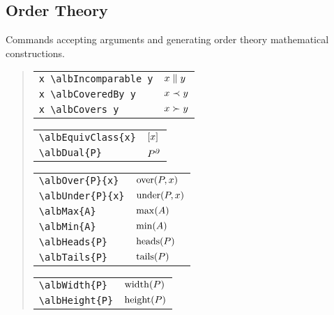 \documentclass[11pt,a4paper,oneside]{alb-latex}
\begin{document}
\subsection{Order Theory}
\label{sec:alb-order-theory-documentation:order-theory}

Commands accepting arguments and generating order theory mathematical
constructions.

\begin{quote}
  \begin{tabular}{p{}@{\qquad}p{}}
    \verb$x \albIncomparable y$ & $x \parallel y$ \\
    \verb$x \albCoveredBy y$ & $x \prec y$ \\
    \verb$x \albCovers y$ & $x \succ y$
  \end{tabular}

  \begin{tabular}{p{}@{\qquad}p{}}
    \verb$\albEquivClass{x}$ & $\albEquivClass{x}$ \\
    \verb$\albDual{P}$ & $\albDual{P}$
  \end{tabular}

  \begin{tabular}{p{}@{\qquad}p{}}
    \verb$\albOver{P}{x}$ & $\operatorname{over}(P, x)$ \\
    \verb$\albUnder{P}{x}$ & $\operatorname{under}(P, x)$ \\
    \verb$\albMax{A}$ & $\operatorname{max}(A)$ \\
    \verb$\albMin{A}$ & $\operatorname{min}(A)$ \\
    \verb$\albHeads{P}$ & $\operatorname{heads}(P)$ \\
    \verb$\albTails{P}$ & $\operatorname{tails}(P)$
  \end{tabular}

  \begin{tabular}{p{}@{\qquad}p{}}
    \verb$\albWidth{P}$ & $\operatorname{width}(P)$ \\
    \verb$\albHeight{P}$ & $\operatorname{height}(P)$
  \end{tabular}


\end{quote}
\end{document}
